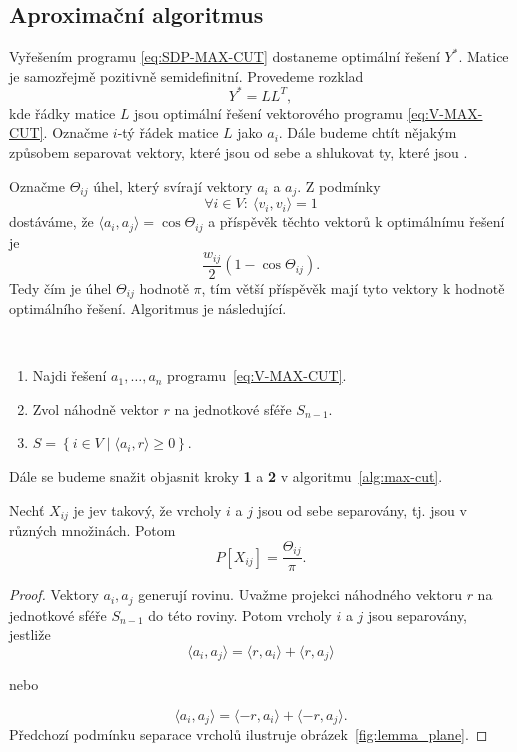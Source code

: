 \subsection{Aproximační algoritmus}

Vyřešením programu \ref{eq:SDP-MAX-CUT} dostaneme optimální řešení $Y^*$. Matice je samozřejmě pozitivně semidefinitní. Provedeme rozklad
$$
    Y^* = LL^T,
$$
kde řádky matice $L$ jsou optimální řešení vektorového programu \ref{eq:V-MAX-CUT}. Označme $i$-tý řádek matice $L$ jako $a_i$. Dále budeme chtít nějakým způsobem separovat vektory, které jsou od sebe  a shlukovat ty, které jsou .

Označme $\Theta_{ij}$ úhel, který svírají vektory $a_i$ a $a_j$. Z podmínky
$$
    \forall i \in V:\ \langle v_i, v_i \rangle = 1
$$
dostáváme, že $\langle a_i, a_j \rangle = \cos \Theta_{ij}$ a příspěvěk těchto vektorů k optimálnímu řešení je
$$
    \frac{w_{ij}}{2} (1 - \cos \Theta_{ij}).
$$
Tedy čím  je úhel $\Theta_{ij}$ hodnotě $\pi$, tím větší příspěvěk mají tyto vektory k hodnotě optimálního řešení. Algoritmus je následující.

\begin{alg}$ $
    \begin{enumerate}
        \item Najdi řešení $a_1, \dots, a_n$ programu~\ref{eq:V-MAX-CUT}.
        \item Zvol náhodně vektor $r$ na jednotkové sféře $S_{n-1}$.
        \item $S = \left\{ i \in V \mid \langle a_i, r \rangle \geq 0 \right\}$.
    \end{enumerate}
    \label{alg:max-cut}
\end{alg}

Dále se budeme snažit objasnit kroky \textbf{1} a \textbf{2} v algoritmu~\ref{alg:max-cut}.

\begin{lm}
    Nechť $X_{ij}$ je jev takový, že vrcholy $i$ a $j$ jsou od sebe separovány, tj. jsou v různých množinách. Potom
    $$
        P\left[ X_{ij} \right] = \frac{\Theta_{ij}}{\pi}.
    $$
    \label{lemma:sep}
\end{lm}

\begin{proof}
    Vektory $a_i, a_j$ generují rovinu. Uvažme projekci náhodného vektoru $r$ na jednotkové sféře $S_{n-1}$ do této roviny. Potom vrcholy $i$ a $j$ jsou separovány, jestliže
    $$
        \langle a_i, a_j \rangle = \langle r, a_i \rangle + \langle r, a_j \rangle
    $$
    \begin{center}
        nebo
    \end{center}
    $$
        \langle a_i, a_j \rangle = \langle -r, a_i \rangle + \langle -r, a_j \rangle.
    $$
    Předchozí podmínku separace vrcholů ilustruje obrázek~\ref{fig:lemma_plane}.
\end{proof}

